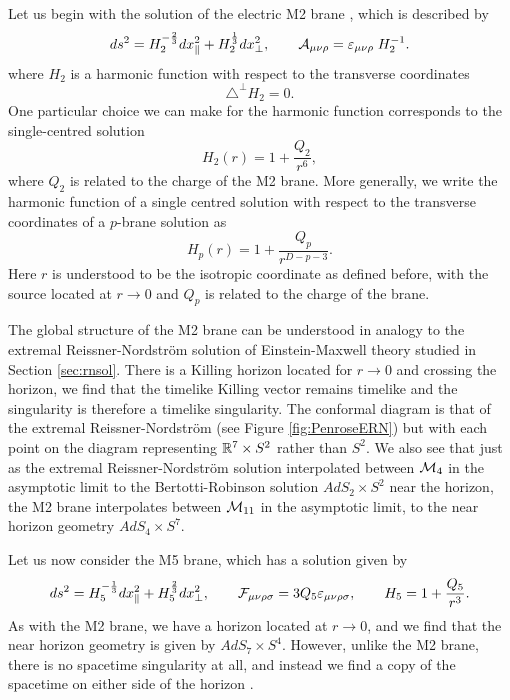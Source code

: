 Let us begin with the solution of the electric M2 brane  \cite{Duff:1990xz}, which is described by
\begin{equation*}
	ds^2 = H_2^{-\frac{2}{3}} dx^2_{\parallel} + H_2^{\frac{1}{3}} dx^2_\perp, \qquad \mathcal{A}_{\mu \nu \rho} = {\varepsilon}_{\mu \nu \rho} \; H_2^{-1}.
\end{equation*}
where $H_2$ is a harmonic function with respect to the transverse coordinates
\begin{equation*}
	\triangle^\perp H_2 = 0.
\end{equation*}
One particular choice we can make for the harmonic function corresponds to the single-centred solution
\begin{equation*}
	H_2(r) = 1 + \frac{Q_2}{r^6},
\end{equation*}
where $Q_2$ is related to the charge of the M2 brane. More generally, we write the harmonic function of a single centred solution with respect to the transverse coordinates of a $p$-brane solution as 
\begin{equation}
\label{eq:genericharmonic}
	H_p(r) = 1 + \frac{Q_p}{r^{D-p-3}}.
\end{equation}
Here $r$ is understood to be the isotropic coordinate as defined before, with the source located at $r \rightarrow 0$ and $Q_p$ is related to the charge of the brane. 

The global structure of the M2 brane can be understood in analogy to the extremal Reissner-Nordstr\"om solution of Einstein-Maxwell theory studied in Section \ref{sec:rnsol}. There is a Killing horizon located for $r \rightarrow 0$ and crossing the horizon, we find that the timelike Killing vector remains timelike and the singularity is therefore a timelike singularity. The conformal diagram is that of the extremal Reissner-Nordstr\"om (see Figure \ref{fig:PenroseERN}) but with each point on the diagram representing ${\mathbb{R}}^7 \times S^2$ rather than $S^2$. We also see that just as the extremal Reissner-Nordstr\"om solution interpolated between ${\cal M}_4$ in the asymptotic limit to the Bertotti-Robinson solution $AdS_2 \times S^2$ near the horizon, the M2 brane interpolates between ${\cal M}_{11}$ in the asymptotic limit, to the near horizon geometry $AdS_4 \times S^7$. 

Let us now consider the M5 brane, which has a solution given by \cite{Gueven:1992hh}
\begin{equation*}
	ds^2 = H_5^{-\frac{1}{3}} dx^2_{\parallel} + H_5^{\frac{2}{3}} dx^2_\perp, \qquad \mathcal{F}_{\mu\nu\rho\sigma} = 3Q_5{\varepsilon}_{\mu\nu\rho\sigma}, \qquad H_5 = 1 + \frac{Q_5}{r^3}.
\end{equation*}
As with the M2 brane, we have a horizon located at $r \rightarrow 0$, and we find that the near horizon geometry is given by $AdS_7 \times S^4$. However, unlike the M2 brane, there is no spacetime singularity at all, and instead we find a copy of the spacetime on either side of the horizon \cite{Gibbons:1994vm}.

